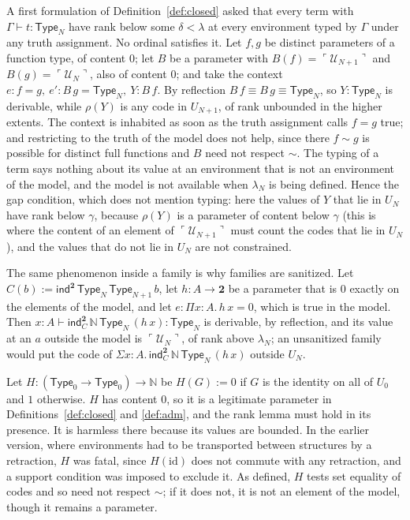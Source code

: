 \documentclass[10pt]{article}
\newcommand{\N}{\mathbb{N}}
\newcommand{\Type}{\mathsf{Type}}
\newcommand{\code}[1]{\ulcorner #1\urcorner}
\newcommand{\U}{\mathcal{U}}
\begin{document}
\begin{example}\label{ex:confusion}
A first formulation of Definition~\ref{def:closed} asked that every term
with $\Gamma\vdash t:\Type_N$ have rank below some $\delta<\lambda$ at
every environment typed by $\Gamma$ under any truth assignment. No
ordinal satisfies it. Let $f,g$ be distinct parameters of a function
type, of content $0$; let $B$ be a parameter with $B(f)=\code{\U_{N+1}}$
and $B(g)=\code{\U_N}$, also of content $0$; and take the context
$e{:}f=g,\ e'{:}B\,g=\Type_N,\ Y{:}B\,f$. By reflection
$B\,f\equiv B\,g\equiv\Type_N$, so $Y:\Type_N$ is derivable, while
$\rho(Y)$ is any code in $U_{N+1}$, of rank unbounded in the higher
extents. The context is inhabited as soon as the truth assignment calls
$f=g$ true; and restricting to the truth of the model does not help,
since there $f\sim g$ is possible for distinct full functions and $B$
need not respect $\sim$. The typing of a term says nothing about its
value at an environment that is not an environment of the model, and
the model is not available when $\lambda_N$ is being defined. Hence the
gap condition, which does not mention typing: here the values of $Y$
that lie in $U_N$ have rank below $\gamma$, because $\rho(Y)$ is a
parameter of content below $\gamma$ (this is where the content of an
element of $\code{\U_{N+1}}$ must count the codes that lie in $U_N$),
and the values that do not lie in $U_N$ are not constrained.

The same phenomenon inside a family is why families are sanitized. Let
$C(b):=\mathsf{ind}^{\mathbf 2}\,\Type_N\,\Type_{N+1}\,b$, let
$h:A\to\mathbf 2$ be a parameter that is $0$ exactly on the elements of
the model, and let $e:\Pi x{:}A.\,h\,x=0$, which is true in the model.
Then $x{:}A\vdash\mathsf{ind}^{\mathbf 2}_C\,\N\,\Type_N\,(h\,x):\Type_N$ is
derivable, by reflection, and its value at an $a$ outside the model is
$\code{\U_N}$, of rank above $\lambda_N$; an unsanitized family would
put the code of $\Sigma x{:}A.\,\mathsf{ind}^{\mathbf 2}_C\,\N\,\Type_N\,(h\,x)$
outside $U_N$.
\end{example}

\begin{example}\label{ex:probe}
Let $H:(\Type_0\to\Type_0)\to\N$ be $H(G):=0$ if $G$ is the identity on
all of $U_0$ and $1$ otherwise. $H$ has content $0$, so it is a
legitimate parameter in Definitions~\ref{def:closed} and \ref{def:adm},
and the rank lemma must hold in its presence. It is harmless there
because its values are bounded. In the earlier version, where
environments had to be transported between structures by a retraction,
$H$ was fatal, since $H(\mathrm{id})$ does not commute with any
retraction, and a support condition was imposed to exclude it. As
defined, $H$ tests set equality of codes and so need not respect
$\sim$; if it does not, it is not an element of the model, though it
remains a parameter.
\end{example}
\end{document}
